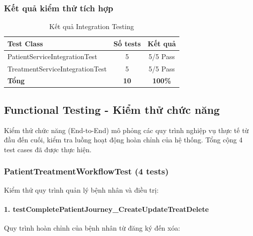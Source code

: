 \subsubsection{Kết quả kiểm thử tích hợp}

\begin{table}[h]
\centering
\caption{Kết quả Integration Testing}
\label{tab:integration-testing}
\begin{tabular}{|l|c|c|}
\hline
\textbf{Test Class} & \textbf{Số tests} & \textbf{Kết quả} \\
\hline
PatientServiceIntegrationTest & 5 & 5/5 Pass \\
TreatmentServiceIntegrationTest & 5 & 5/5 Pass \\
\hline
\textbf{Tổng} & \textbf{10} & \textbf{100\%} \\
\hline
\end{tabular}
\end{table}

\subsection{Functional Testing - Kiểm thử chức năng}

Kiểm thử chức năng (End-to-End) mô phỏng các quy trình nghiệp vụ thực tế từ đầu đến cuối, kiểm tra luồng hoạt động hoàn chỉnh của hệ thống. Tổng cộng 4 test cases đã được thực hiện.

\subsubsection{PatientTreatmentWorkflowTest (4 tests)}

Kiểm thử quy trình quản lý bệnh nhân và điều trị:

\paragraph{1. testCompletePatientJourney\_CreateUpdateTreatDelete}

Quy trình hoàn chỉnh của bệnh nhân từ đăng ký đến xóa:

